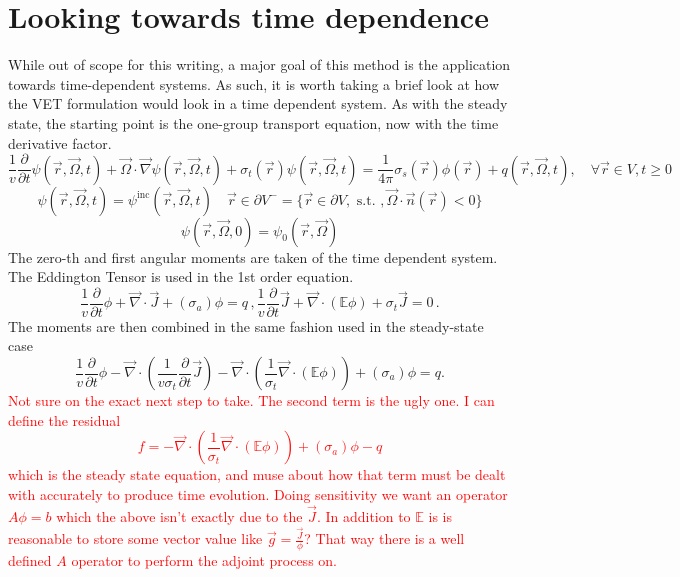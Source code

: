 \documentclass[12pt]{report}
\newcommand{\vr}{\vec{r}}
\newcommand{\vO}{\vec{\Omega}}
\renewcommand{\div}{\vec{\nabla} \cdot}
\newcommand{\grad}{\vec{\nabla}}
\newcommand{\Edd}{\mathbb{E}}
\newcommand{\sigt}{\sigma_t}
\newcommand{\sigs}{\sigma_s}
\newcommand{\siga}{\sigma_a}
\newcommand{\scalSource}{q}
\newcommand{\comment}[2]{\marginpar{\textcolor{#2}{$\star$}}\textcolor{#2}{#1}\newline}
\newcommand{\iwh}[1]{\comment{#1}{red}}
\newcommand{\iwh}[1]{\phantom{a}}
\begin{document}
\section{Looking towards time dependence}
While out of scope for this writing, a major goal of this method is the application towards time-dependent systems. As such, it is worth taking a brief look at how the VET formulation would look in a time dependent system. As with the steady state, the starting point is the one-group transport equation, now with the time derivative factor.
\begin{equation}
\label{Trans1GTE}
\frac{1}{v} \frac{\partial}{\partial t} \psi(\vr,\vO,t)+ \vO \cdot \grad \psi(\vr,\vO,t) + \sigt(\vr) \psi(\vr,\vO,t) = \frac{1}{4 \pi} \sigs(\vr) \phi(\vr) + q(\vr,\vO,t), \quad \forall \vr \in V,t \geq 0
\end{equation}
\begin{equation}
\label{Trans1GTE_bc}
\psi(\vr,\vO,t) = \psi^{\text{inc}}(\vr,\vO,t) \quad \vr \in \partial V^{-} = \{ \vr \in \partial V, \text{ s.t. }, \vO \cdot \vec{n}(\vr) < 0\}
\end{equation}
\begin{equation}
\label{Trans1GTE_t0}
\psi(\vr,\vO,0) = \psi_0(\vr,\vO)
\end{equation}
The zero-th and first angular moments are taken of the time dependent system. The Eddington Tensor is used in the 1st order equation.
\begin{subequations}
%
\begin{equation}
\label{0amTrans}
\frac{1}{v} \frac{\partial}{\partial t}\phi + \div \vec{J} + (\siga) \phi = \scalSource \,,
\end{equation}
%
\begin{equation}
\label{1amTrans}
\frac{1}{v} \frac{\partial}{\partial t}\vec{J}  + \div \left( \Edd \phi \right) + \sigt \vec{J} = 0 \,.
\end{equation}
%
\end{subequations}
The moments are then combined in the same fashion used in the steady-state case
\begin{equation}
\label{VETTrans}
\frac{1}{v} \frac{\partial}{\partial t}\phi - \div \left( \frac{1}{v \sigt} \frac{\partial}{\partial t}\vec{J} \right)   - \div \left( \frac{1}{\sigt} \div \left( \Edd \phi \right) \right)  + (\siga) \phi = \scalSource.
\end{equation}
\iwh{Not sure on the exact next step to take. The second term is the ugly one. I can define the residual 
\begin{equation}
f=- \div \left( \frac{1}{\sigt} \div \left( \Edd \phi \right) \right)  + (\siga) \phi - \scalSource
\end{equation}
which is the steady state equation, and muse about how that term must be dealt with accurately to produce time evolution. 
Doing sensitivity we want an operator $A \phi = b$ which the above isn't exactly due to the $\vec{J}$. In addition to $\Edd$ is is reasonable to store some vector value like $\vec{g}=\frac{\vec{J}}{\phi}$? That way there is a well defined $A$ operator to perform the adjoint process on.}
\end{document}
